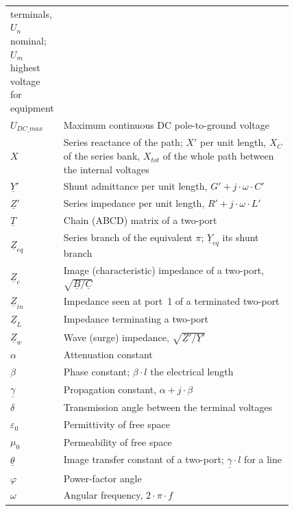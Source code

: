 \begin{longtable}{@{}l p{0.82\linewidth}@{}}
            terminals, $U_n$ nominal; $U_m$ highest voltage for equipment \\
  $U_{DC\_max}$ & Maximum continuous DC pole-to-ground voltage \\
  $X$     & Series reactance of the path; $X'$ per unit length, $X_C$ of the
            series bank, $X_{tot}$ of the whole path between the internal
            voltages \\
  $\underline{Y}'$ & Shunt admittance per unit length, $G' + j \cdot \omega \cdot C'$ \\
  $\underline{Z}'$ & Series impedance per unit length, $R' + j \cdot \omega \cdot L'$ \\
  $\underline{T}$ & Chain (ABCD) matrix of a two-port \\
  $\underline{Z}_{eq}$ & Series branch of the equivalent $\pi$;
            $\underline{Y}_{eq}$ its shunt branch \\
  $\underline{Z}_c$ & Image (characteristic) impedance of a two-port,
            $\sqrt{\underline{B}/\underline{C}}$ \\
  $\underline{Z}_{in}$ & Impedance seen at port~1 of a terminated two-port \\
  $\underline{Z}_L$ & Impedance terminating a two-port \\
  $\underline{Z}_w$ & Wave (surge) impedance, $\sqrt{\underline{Z}'/\underline{Y}'}$ \\
  \midrule
  $\alpha$   & Attenuation constant \\
  $\beta$    & Phase constant; $\beta \cdot l$ the electrical length \\
  $\underline{\gamma}$ & Propagation constant, $\alpha + j \cdot \beta$ \\
  $\delta$   & Transmission angle between the terminal voltages \\
  $\varepsilon_0$ & Permittivity of free space \\
  $\mu_0$    & Permeability of free space \\
  $\underline{\theta}$ & Image transfer constant of a two-port;
            $\underline{\gamma} \cdot l$ for a line \\
  $\varphi$  & Power-factor angle \\
  $\omega$   & Angular frequency, $2 \cdot \pi \cdot f$ \\
  \bottomrule
\end{longtable}

\FloatBarrier

